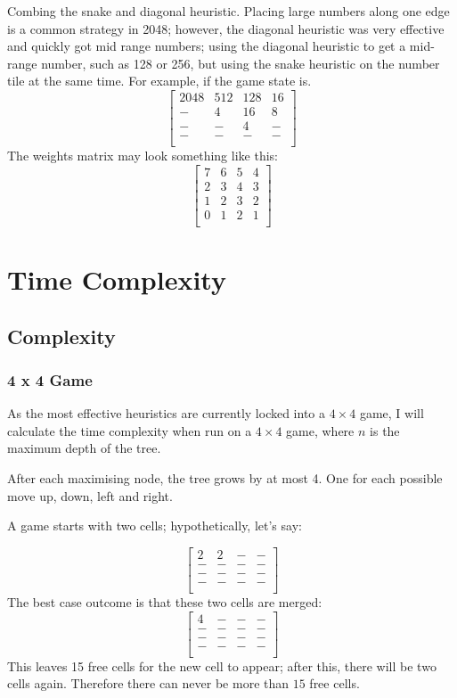 \documentclass{article}
\begin{document}
Combing the snake and diagonal heuristic. Placing large numbers along one edge is a common strategy in 2048; however, the diagonal heuristic was very effective and quickly got mid range numbers; using the diagonal heuristic to get a mid-range number, such as 128 or 256,  but using the snake heuristic on the number tile at the same time.
For example, if the game state is.
\[
\begin{bmatrix}
    2048 & 512 & 128 & 16 \\
    - & 4 & 16 & 8 \\
    - & -  & 4 & - \\
    - & - & - & - \\
\end{bmatrix}
\]
The weights matrix may look something like this:
\[
\begin{bmatrix}
     7 & 6 & 5 & 4 \\
     2 & 3 & 4 & 3 \\
     1 & 2 & 3 & 2 \\
     0 & 1 & 2 & 1 \\
\end{bmatrix}
\]
\section{Time Complexity}
\label{sec:complexity}
\subsection{Complexity}
\label{subsec:time_comp}
\subsubsection{4 x 4 Game}
As the most effective heuristics are currently locked into a $4\times4$ game, I will calculate the time complexity when run on a $4 \times 4$ game, where $n$ is the maximum depth of the tree.

After each maximising node, the tree grows by at most 4. One for each possible move up, down, left and right.

A game starts with two cells; hypothetically, let's say:

\[
\begin{bmatrix}
    2&2&-&-\\
    -&-&-&-\\
    -&-&-&-\\
    -&-&-&-\\
\end{bmatrix}
\]
The best case outcome is that these two cells are merged:
\[
\begin{bmatrix}
    4&-&-&-\\
    -&-&-&-\\
    -&-&-&-\\
    -&-&-&-\\
\end{bmatrix}
\]
This leaves 15 free cells for the new cell to appear; after this, there will be two cells again.
Therefore there can never be more than $15$ free cells.
\end{document}
